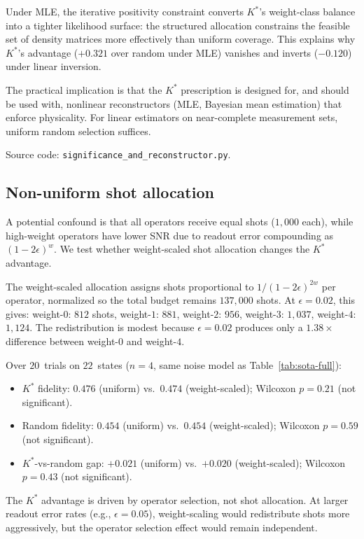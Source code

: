 \documentclass[twocolumn,prx,aps,superscriptaddress,longbibliography]{revtex4-2}
\begin{document}
Under MLE, the iterative positivity constraint converts $K^*$'s
weight-class balance into a tighter likelihood surface: the
structured allocation constrains the feasible set of density
matrices more effectively than uniform coverage.  This explains
why $K^*$'s advantage ($+0.321$ over random under MLE) vanishes
and inverts ($-0.120$) under linear inversion.

The practical implication is that the $K^*$ prescription is designed
for, and should be used with, nonlinear reconstructors (MLE,
Bayesian mean estimation) that enforce physicality.  For linear
estimators on near-complete measurement sets, uniform random
selection suffices.

Source code: \texttt{significance\_and\_reconstructor.py}.

\subsection{Non-uniform shot allocation}
\label{sec:shot-alloc}

A potential confound is that all operators receive equal shots
($1{,}000$ each), while high-weight operators have lower SNR due
to readout error compounding as $(1 - 2\epsilon)^w$.  We test
whether weight-scaled shot allocation changes the $K^*$ advantage.

The weight-scaled allocation assigns shots proportional to
$1/(1 - 2\epsilon)^{2w}$ per operator, normalized so the total
budget remains $137{,}000$ shots.  At $\epsilon = 0.02$, this
gives: weight-$0$: $812$ shots, weight-$1$: $881$, weight-$2$:
$956$, weight-$3$: $1{,}037$, weight-$4$: $1{,}124$.  The
redistribution is modest because $\epsilon = 0.02$ produces only
a $1.38\times$ difference between weight-$0$ and weight-$4$.

Over $20$~trials on $22$~states ($n = 4$, same noise model as
Table~\ref{tab:sota-full}):
\begin{itemize}
\item $K^*$ fidelity: $0.476$ (uniform) vs.\ $0.474$
(weight-scaled); Wilcoxon $p = 0.21$ (not significant).
\item Random fidelity: $0.454$ (uniform) vs.\ $0.454$
(weight-scaled); Wilcoxon $p = 0.59$ (not significant).
\item $K^*$-vs-random gap: $+0.021$ (uniform) vs.\ $+0.020$
(weight-scaled); Wilcoxon $p = 0.43$ (not significant).
\end{itemize}

The $K^*$ advantage is driven by operator selection, not shot
allocation.  At larger readout error rates (e.g., $\epsilon = 0.05$),
weight-scaling would redistribute shots more aggressively, but the
operator selection effect would remain independent.
\end{document}
